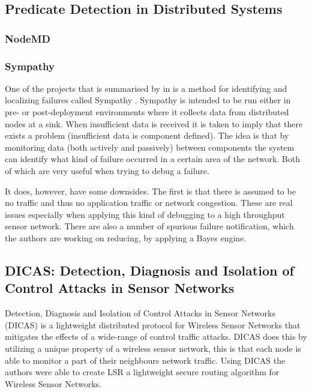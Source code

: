 \subsection{Predicate Detection in Distributed Systems}

\subsubsection{NodeMD}
\cite{NodeMD}


\subsubsection{Sympathy}

One of the projects that is summarised by \citeauthor{herbert2007adaptive} in \cite{herbert2007adaptive} is a method for identifying and localizing failures called Sympathy \cite{ramanathan2005sympathy}. Sympathy is intended to be run either in pre- or post-deployment environments where it collects data from distributed nodes at a sink. When insufficient data is received it is taken to imply that there exists a problem (insufficient data is component defined). The idea is that by monitoring data (both actively and passively) between components the system can identify what kind of failure occurred in a certain area of the network. Both of which are very useful when trying to debug a failure.

It does, however, have some downsides. The first is that there is assumed to be no traffic and thus no application traffic or network congestion. These are real issues especially when applying this kind of debugging to a high throughput sensor network. There are also a number of spurious failure notification, which the authors are working on reducing, by applying a Bayes engine.

\subsection {DICAS: Detection, Diagnosis and Isolation of Control Attacks in Sensor Networks}

Detection, Diagnosis and Isolation of Control Attacks in Sensor Networks (DICAS) \cite{dicaspaper} is a lightweight distributed protocol for Wireless Sensor Networks that mitigates the effects of a wide-range of control traffic attacks. DICAS does this by utilizing a unique property of a wireless sensor network, this is that each node is able to monitor a part of their neighbours network traffic. Using DICAS the authors were able to create LSR a lightweight secure routing algorithm for Wireless Sensor Networks.

